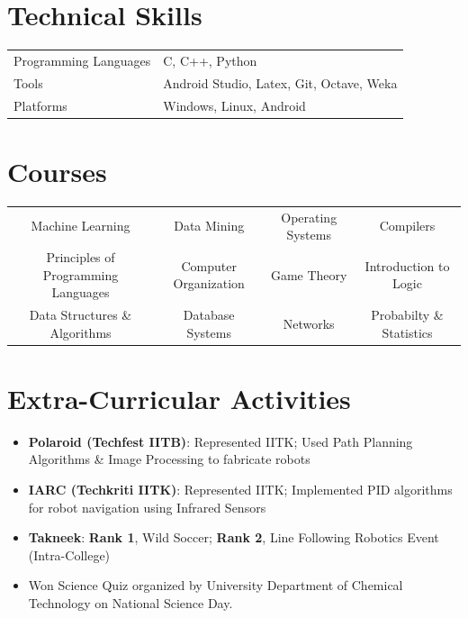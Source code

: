 \documentclass[a4paper]{article} %
\newcommand{\bulletspace}{0.7cm}
\begin{document}
\section{Technical Skills}
    {
        \begin{table}[ht]
        \begin{tabular}{l l}
        \small Programming Languages & \small C, C++, Python\\
        \small Tools & \small Android Studio, Latex, Git, Octave, Weka\\
        \small Platforms & \small Windows, Linux, Android
        \end{tabular}
        \end{table}
    }



\section{Courses}
    {
        \begin{table}[ht]
        \begin{tabular}{c c c c}
        \small
                Machine Learning & \small Data Mining & \small Operating Systems & \small Compilers\\ 
                \small Principles of Programming Languages &\small Computer Organization &\small Game Theory &\small Introduction to Logic\\ 
                \small Data Structures \& Algorithms &\small Database Systems &\small Networks &\small Probabilty \& Statistics\\
        \end{tabular}
        \end{table}
    }





\section{Extra-Curricular Activities}
 \begin{itemize}[leftmargin=\bulletspace{}]
        \item \textbf{Polaroid (Techfest IITB)}: Represented IITK; Used Path Planning Algorithms \& Image Processing to fabricate robots 
        \item \textbf{IARC (Techkriti IITK)}: Represented IITK; Implemented PID algorithms for robot navigation using Infrared Sensors
        \item \textbf{Takneek}: \textbf{Rank 1}, Wild Soccer; \textbf{Rank 2}, Line Following Robotics Event (Intra-College)
        \item Won Science Quiz organized by University Department of Chemical Technology on National Science Day. 
         \end{itemize}
\end{document}
